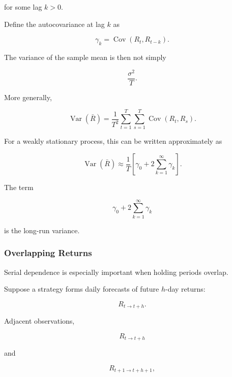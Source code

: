 \documentclass[11pt,a4paper]{article}
\begin{document}
for some lag $k>0$.

Define the autocovariance at lag $k$ as

\begin{equation}
\gamma_k
=
\operatorname{Cov}
\left(
R_t,
R_{t-k}
\right).
\end{equation}

The variance of the sample mean is then not simply

\begin{equation}
\frac{\sigma^2}{T}.
\end{equation}

More generally,

\begin{equation}
\operatorname{Var}(\bar{R})
=
\frac{1}{T^2}
\sum_{t=1}^{T}
\sum_{s=1}^{T}
\operatorname{Cov}(R_t,R_s).
\end{equation}

For a weakly stationary process, this can be written approximately as

\begin{equation}
\boxed{
\operatorname{Var}(\bar{R})
\approx
\frac{1}{T}
\left[
\gamma_0
+
2
\sum_{k=1}^{\infty}
\gamma_k
\right].
}
\end{equation}

The term

\begin{equation}
\gamma_0
+
2
\sum_{k=1}^{\infty}
\gamma_k
\end{equation}

is the long-run variance.


\subsubsection{Overlapping Returns}

Serial dependence is especially important when holding periods overlap.

Suppose a strategy forms daily forecasts of future $h$-day returns:

\begin{equation}
R_{t\rightarrow t+h}.
\end{equation}

Adjacent observations,

\begin{equation}
R_{t\rightarrow t+h}
\end{equation}

and

\begin{equation}
R_{t+1\rightarrow t+h+1},
\end{equation}
\end{document}
